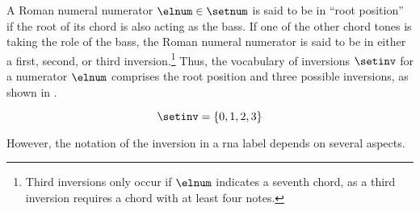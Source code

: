 
A Roman numeral numerator $\elnum \in \setnum$ is said to be
in ``root position'' if the root of its chord is also acting
as the bass. If one of the other chord tones is taking the
role of the bass, the Roman numeral numerator is said to be
in either a first, second, or third
inversion.\footnote{Third inversions only occur if $\elnum$
indicates a seventh chord, as a third inversion requires a
chord with at least four notes.} Thus, the vocabulary of
inversions $\setinv$ for a numerator $\elnum$ comprises the
root position and three possible inversions, as shown in
.

\begin{equation}
    \label{eq:inversion_vocabulary}
    \setinv = \{ 0, 1, 2, 3 \}
\end{equation}


However, the notation of the inversion in a \gls{rna} label
depends on several aspects.


        
